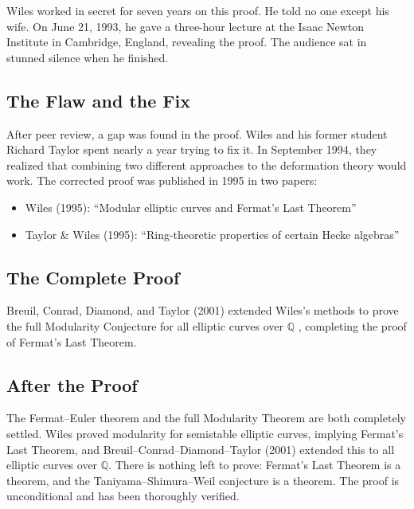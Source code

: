 \begin{highlightbox}
Wiles worked in secret for seven years on this proof. He told no one except his wife. On June 21, 1993, he gave a three-hour lecture at the Isaac Newton Institute in Cambridge, England, revealing the proof. The audience sat in stunned silence when he finished.
\end{highlightbox}

\subsection{The Flaw and the Fix}

After peer review, a gap was found in the proof. Wiles and his former student Richard Taylor spent nearly a year trying to fix it. In September 1994, they realized that combining two different approaches to the deformation theory would work. The corrected proof was published in 1995 in two papers:

\begin{itemize}
\item Wiles (1995): ``Modular elliptic curves and Fermat's Last Theorem'' \cite{wiles1995}
\item Taylor \& Wiles (1995): ``Ring-theoretic properties of certain Hecke algebras'' \cite{taylorwiles1995}
\end{itemize}

\subsection{The Complete Proof}

Breuil, Conrad, Diamond, and Taylor (2001) extended Wiles's methods to prove the full Modularity Conjecture for all elliptic curves over $\mathbb{Q}$ \cite{bcdt2001}, completing the proof of Fermat's Last Theorem.

\subsection{After the Proof}

The Fermat--Euler theorem and the full Modularity Theorem are both completely settled. Wiles proved modularity for semistable elliptic curves, implying Fermat's Last Theorem, and Breuil--Conrad--Diamond--Taylor (2001) extended this to all elliptic curves over $\mathbb{Q}$. There is nothing left to prove: Fermat's Last Theorem is a theorem, and the Taniyama--Shimura--Weil conjecture is a theorem. The proof is unconditional and has been thoroughly verified.

